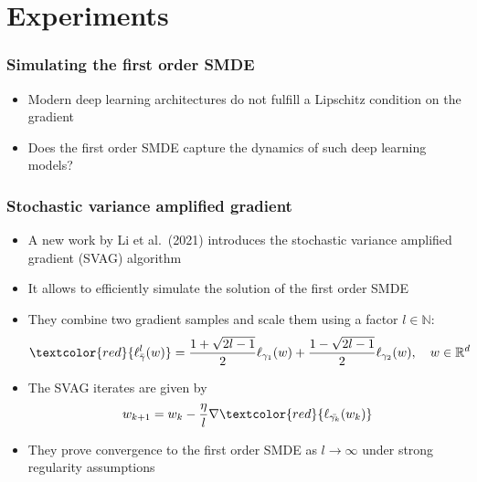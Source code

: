 \documentclass[aspectratio=1610,10pt,ucs]{beamer} %
\newcommand{\R}{\mathbb{R}}
\newcommand{\N}{\mathbb{N}}
\begin{document}
\section{Experiments}
\begin{frame}
  \frametitle{Simulating the first order SMDE}
  \begin{itemize}
    \item Modern deep learning architectures do not fulfill a Lipschitz condition on the gradient
    \item Does the first order SMDE capture the dynamics of such deep learning models?
  \end{itemize}
\end{frame}
\begin{frame}
  \frametitle{Stochastic variance amplified gradient}
  \begin{itemize}
    \item A new work by Li et al.\ (2021) introduces the stochastic variance amplified gradient (SVAG) algorithm
    \item It allows to efficiently simulate the solution of the first order SMDE
    \item They combine two gradient samples and scale them using a factor $l \in \N$:
    $$\textcolor{red}{\ell^l_{\bar{\gamma}}(w)} =  \frac{1+\sqrt{2l - 1}}{2}\ell_{\gamma_{1}}(w) + \frac{1-\sqrt{2l - 1}}{2}\ell_{\gamma_{2}}(w), \quad w \in \R^d$$
    \item The SVAG iterates are given by
    \begin{equation*}
      w_{k+1} = w_{k} - \frac{\eta}{l} \nabla \textcolor{red}{\ell_{\bar{\gamma_k}}(w_{k})}
    \end{equation*}
    \item They prove convergence to the first order SMDE as $l \rightarrow \infty$ under strong regularity assumptions
  \end{itemize}
\end{frame}
\end{document}
